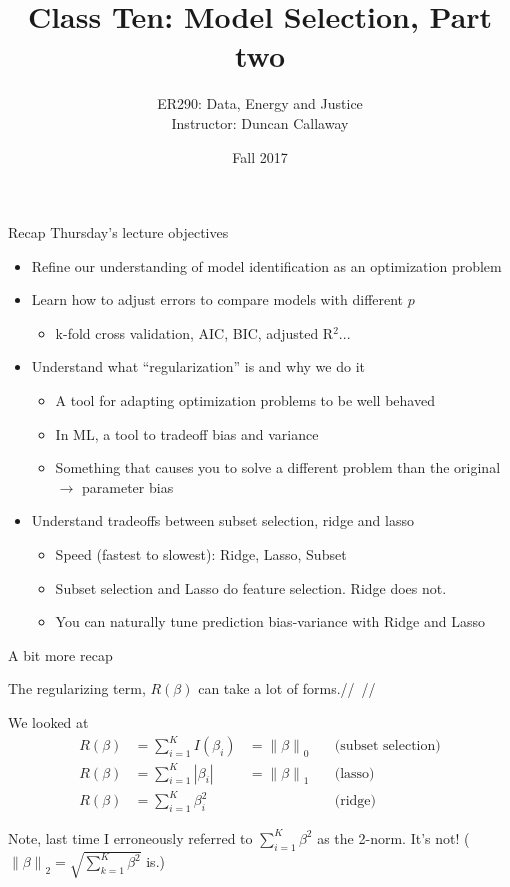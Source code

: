 \documentclass[mathserif]{beamer}
\title{Class Ten: Model Selection, Part two}
\author{{ER290: Data, Energy and Justice\\  Instructor: Duncan Callaway} \\
}
\institute{University of California, Berkeley}
\date{Fall 2017}
\newcommand{\norm}[1]{\left\lVert #1 \right\rVert}
\begin{document}
\frame{
  \titlepage
}


\begin{frame}{Recap Thursday's lecture objectives}
\begin{itemize}
\item Refine our understanding of model identification as an optimization problem
\item Learn how to adjust errors to compare models with different $p$
\begin{itemize}
\item<3-> k-fold cross validation, AIC, BIC, adjusted R$^2$...
\end{itemize}
\item Understand what ``regularization'' is and why we do it
\begin{itemize}
\item<4-> A tool for adapting optimization problems to be well behaved
\item<4-> In ML, a tool to tradeoff bias and variance 
\item<4-> Something that causes you to solve a different problem than the original $\rightarrow$ parameter bias
\end{itemize}
\item Understand tradeoffs between subset selection, ridge and lasso
\begin{itemize}
\item<5-> Speed (fastest to slowest): Ridge, Lasso, Subset
\item<5-> Subset selection and Lasso do feature selection.  Ridge does not.
\item<5-> You can naturally tune prediction bias-variance with Ridge and Lasso
\end{itemize}
\end{itemize}
\end{frame}

\begin{frame}{A bit more recap}

The regularizing term, $R(\beta)$ can take a lot of forms.//~//

We looked at
\begin{align*}
R(\beta)  &=\sum_{i=1}^K I(\beta_i) &= \norm{\beta}_0\quad &\text{(subset selection)}\\
R(\beta)  &=\sum_{i=1}^K |\beta_i| &= \norm{\beta}_1\quad &\text{(lasso)}\\
R(\beta) &=\sum_{i=1}^K \beta_i^2 &\quad &\text{(ridge)}
\end{align*}

Note, last time I erroneously referred to $\sum_{i=1}^K \beta^2$ as the 2-norm.  It's not!  ($\norm{\beta}_2 = \sqrt{\sum_{k=1}^K \beta^2}$ is.)

\end{frame}
\end{document}
